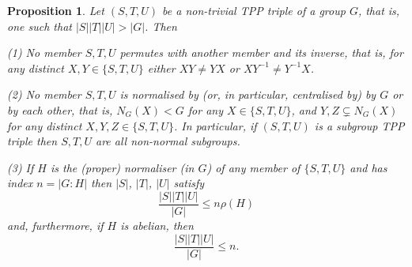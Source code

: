 \documentclass{amsart}
\theoremstyle{observation}
\newtheorem{proposition}[theorem]{Proposition}
\theoremstyle{definition}
\theoremstyle{remark}
\numberwithin{equation}{section}
\begin{document}
\begin{proposition}\label{PropTPPPermSubsets}Let $(S, T, U)$ be a non-trivial TPP triple of a group $G$, that is, one such that $|S||T||U| > |G|$. Then

\vspace{1mm}

\textup{(1)} No member $S, T, U$ permutes with another member and its inverse, that is, for any distinct $X, Y \in \{S, T, U\}$ either $XY \neq YX$ or $XY^{-1} \neq Y^{-1}X$.

\vspace{1mm}

\textup{(2)} No member $S, T, U$ is normalised by (or, in particular, centralised by) by $G$ or by each other, that is,  $N_G(X) < G$ for any $X \in \{S, T, U\}$, and $Y, Z \subsetneq N_G(X)$ for any distinct $X, Y, Z \in \{S, T, U\}$. In particular, if $(S, T, U)$ is a subgroup TPP triple then $S, T, U$ are all non-normal subgroups.

\vspace{1mm}

\textup{(3)} If $H$ is the (proper) normaliser (in $G$) of any member of $\{S, T, U\}$ and has index $n = |G: H|$ then $|S|$, $|T|$, $|U|$ satisfy
\begin{equation}
\frac{|S||T||U|}{|G|} \leq n\rho(H)
\end{equation}
and, furthermore, if $H$ is abelian, then
\begin{equation}
\frac{|S||T||U|}{|G|} \leq n.
\end{equation}
\end{proposition}
\end{document}
